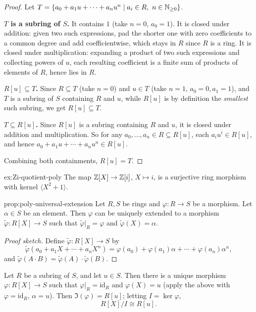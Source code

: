 \begin{proof}
Let $T = \{ a_0 + a_1 u + \cdots + a_n u^n \mid a_i \in R,\ n \in \mathbb{N}_{\geq 0} \}$.

\textbf{$T$ is a subring of $S$.} It contains $1$ (take $n=0$, $a_0=1$). It is closed under addition: given two such expressions, pad the shorter one with zero coefficients to a common degree and add coefficientwise, which stays in $R$ since $R$ is a ring. It is closed under multiplication: expanding a product of two such expressions and collecting powers of $u$, each resulting coefficient is a finite sum of products of elements of $R$, hence lies in $R$.

\textbf{$R[u] \subseteq T$.} Since $R \subseteq T$ (take $n=0$) and $u \in T$ (take $n=1$, $a_0=0, a_1=1$), and $T$ is a subring of $S$ containing $R$ and $u$, while $R[u]$ is by definition the \emph{smallest} such subring, we get $R[u] \subseteq T$.

\textbf{$T \subseteq R[u]$.} Since $R[u]$ is a subring containing $R$ and $u$, it is closed under addition and multiplication. So for any $a_0, \ldots, a_n \in R \subseteq R[u]$, each $a_i u^i \in R[u]$, and hence $a_0 + a_1 u + \cdots + a_n u^n \in R[u]$.

Combining both containments, $R[u] = T$.
\end{proof}

\begin{example}{}{ex:Zi-quotient-poly}
The map $\mathbb{Z}[X] \to \mathbb{Z}[i]$, $X \mapsto i$, is a surjective ring morphism with kernel $\langle X^2+1 \rangle$.
\end{example}

\begin{proposition}{}{prop:poly-universal-extension}
Let $R, S$ be rings and $\varphi: R \to S$ be a morphism. Let $\alpha \in S$ be an element. Then $\varphi$ can be uniquely extended to a morphism $\widetilde\varphi: R[X] \to S$ such that $\widetilde\varphi|_R = \varphi$ and $\widetilde\varphi(X) = \alpha$.
\end{proposition}

\begin{proof}[Proof sketch]
Define $\widetilde\varphi: R[X] \to S$ by
\[
\widetilde\varphi(a_0 + a_1 X + \cdots + a_n X^n) = \varphi(a_0) + \varphi(a_1)\alpha + \cdots + \varphi(a_n)\alpha^n,
\]
and $\widetilde\varphi(A \cdot B) = \widetilde\varphi(A) \cdot \widetilde\varphi(B)$.
\end{proof}

Let $R$ be a subring of $S$, and let $u \in S$. Then there is a unique morphism $\varphi: R[X] \to S$ such that $\varphi|_R = \mathrm{id}_R$ and $\varphi(X) = u$ (apply the above with $\varphi = \mathrm{id}_R$, $\alpha = u$). Then $\Im(\varphi) = R[u]$; letting $I = \ker \varphi$,
\[
R[X]/I \cong R[u].
\]

